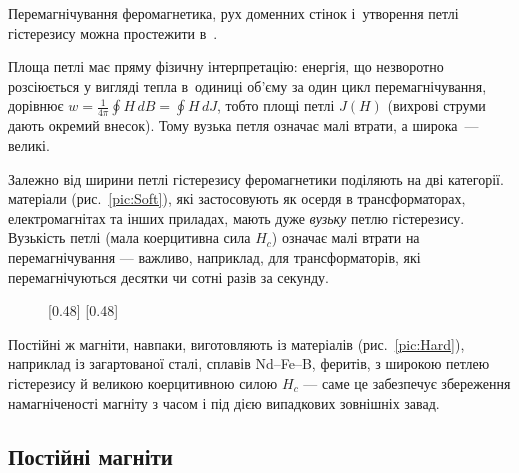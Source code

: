\begin{Simulation}
Перемагнічування феромагнетика, рух доменних стінок і~утворення петлі гістерезису можна простежити в~.
\end{Simulation}


Площа петлі має пряму фізичну інтерпретацію: енергія, що незворотно розсіюється у вигляді тепла в~одиниці об'єму за один цикл перемагнічування, дорівнює $w=\frac1{4\pi}\oint H\,dB=\oint H\,dJ$, тобто площі петлі $J(H)$ (вихрові струми дають окремий внесок). Тому вузька петля означає малі втрати, а широка~--- великі.

Залежно від ширини петлі гістерезису феромагнетики поділяють на дві категорії.  матеріали (рис.~\ref{pic:Soft}), які застосовують як осердя в трансформаторах, електромагнітах та інших приладах, мають дуже
\emph{вузьку} петлю гістерезису. Вузькість петлі (мала коерцитивна сила $H_c$) означає малі втрати на перемагнічування --- важливо, наприклад,
для трансформаторів, які перемагнічуються десятки чи сотні разів за секунду.

\begin{figure}[h!]\centering
	[0.48\linewidth]{
		\centering
	}
	\hfill
	[0.48\linewidth]{
		\centering
	}
\end{figure}

Постійні ж магніти, навпаки, виготовляють із  матеріалів (рис.~\ref{pic:Hard}), наприклад із загартованої сталі, сплавів Nd--Fe--B, феритів, з
широкою петлею гістерезису й великою коерцитивною силою $H_c$ --- саме це забезпечує збереження намагніченості магніту з часом і під дією
випадкових зовнішніх завад.

\subsection*{Постійні магніти}

